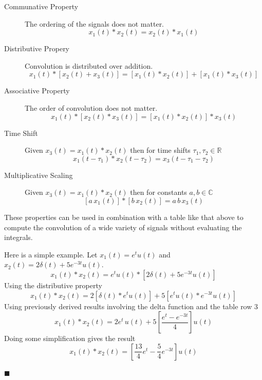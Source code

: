 \begin{description}
\item [Communative Property] The ordering of the signals does not matter.
  \[
x_1(t) * x_2(t) = x_2(t) * x_1(t)
  \]
\item [Distributive Propery] Convolution is distributed over addition.
  \[
  x_1(t) * \left[x_2(t) + x_3(t)\right] = \left[x_1(t) * x_2(t) \right] + \left[x_1(t) * x_3(t) \right] 
  \]
\item [Associative Property] The order of convolution does not matter.
    \[
  x_1(t) * \left[x_2(t) * x_3(t)\right] = \left[x_1(t) * x_2(t) \right] * x_3(t) 
  \]
\item [Time Shift] Given $x_3(t) = x_1(t) * x_2(t)$ then for time shifts $\tau_1, \tau_2 \in \mathbb{R}$
  \[
  x_1(t-\tau_1) * x_2(t-\tau_2) = x_3(t-\tau_1 - \tau_2)
  \]
\item [Multiplicative Scaling] Given $x_3(t) = x_1(t) * x_2(t)$ then for constants $a,b \in \mathbb{C}$
  \[
  \left[a\, x_1(t)\right] * \left[b\, x_2(t)\right] = a\, b\, x_3(t)
  \]
\end{description}

These properties can be used in combination with a table like that above to compute the convolution of a wide variety of signals without evaluating the integrals.

\begin{example} Here is a simple example. Let $x_1(t) = e^tu(t)$ and $x_2(t) = 2\delta(t) + 5e^{-3t}u(t)$.
  \[
  x_1(t) * x_2(t) =  e^tu(t) * \left[2\delta(t) + 5e^{-3t}u(t)\right] 
  \]
  Using the distributive property
  \[
  x_1(t) * x_2(t) =  2\left[\delta(t) * e^tu(t)\right]  + 5\left[e^tu(t) * e^{-3t}u(t)\right]
  \]
  Using previously derived results involving the delta function and the table row 3
  \[
  x_1(t) * x_2(t) = 2 e^t\, u(t) + 5\left[ \frac{e^t-e^{-3t}}{4}\right]u(t)
  \]
  Doing some simplification gives the result
  \[
  x_1(t) * x_2(t) = \left[ \frac{13}{4}e^t-\frac{5}{4}e^{-3t}\right]u(t)
  \]
  
$\blacksquare$
\end{example}

